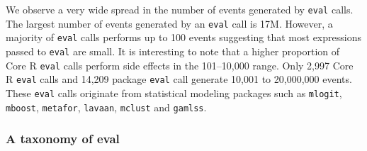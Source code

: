 \documentclass[a4paper,USenglish,cleveref, autoref, thm-restate]{lipics-v2019}
\newcommand{\EventsMaxCountRnd}{17M\xspace}
\newcommand{\EventsMaxRangeA}{100\xspace}
\newcommand{\EventsMinRangeB}{101\xspace}
\newcommand{\EventsMaxRangeB}{10,000\xspace}
\newcommand{\EventsMinRangeC}{10,001\xspace}
\newcommand{\EventsMaxRangeC}{20,000,000\xspace}
\newcommand{\EventsCoreEvalCountC}{2,997\xspace}
\newcommand{\EventsPackageEvalCountC}{14,209\xspace}
\newcommand{\eval}{\texttt{eval}\xspace}
\newcommand{\mlogit}{\c{mlogit}}
\newcommand{\mboost}{\c{mboost}}
\newcommand{\metafor}{\c{metafor}}
\newcommand{\lavaan}{\c{lavaan}}
\newcommand{\mclust}{\c{mclust}}
\newcommand{\gamlss}{\c{gamlss}}
\renewcommand{\c}[1]{\lstinline{#1}\xspace}
\begin{document}
We observe a very wide spread in the number of events generated by \eval
calls. The largest number of events generated by an \eval call is
\EventsMaxCountRnd.  However, a majority of \eval calls performs up to
\EventsMaxRangeA events suggesting that most expressions passed to \eval are
small.  It is interesting to note that a higher proportion of Core R \eval
calls perform side effects in the \EventsMinRangeB--\EventsMaxRangeB range.
Only \EventsCoreEvalCountC Core R \eval calls and \EventsPackageEvalCountC
package \eval call generate \EventsMinRangeC to \EventsMaxRangeC events.
These \eval calls originate from statistical modeling packages such as
\mlogit, \mboost, \metafor, \lavaan, \mclust and \gamlss.


\subsubsection{A taxonomy of eval}

\end{document}
